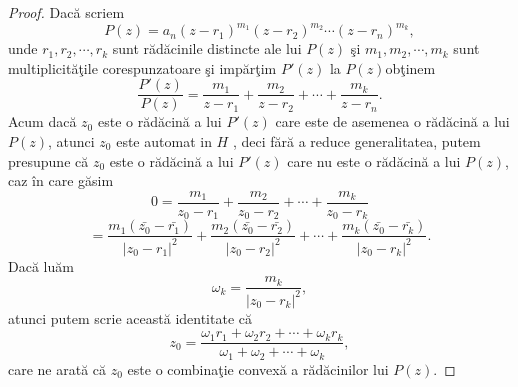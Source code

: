 \documentclass[a4paper,12pt,oneside]{report}
\begin{document}
\begin{proof}
Dac\u{a} scriem
\begin{displaymath}
  P\left ( z \right ) = a_{n}\left ( z - r_{1} \right )^{m_{1}}\left ( z - r_{2} \right )^{m_{2}}\cdots \left ( z - r_{n} \right )^{m_{k}},
\end{displaymath}
unde  \(r_{1} , r_{2}, \cdots, r_{k}\) sunt r\u{a}d\u{a}cinile distincte ale lui \(P\left ( z \right )\) \c{s}i \(m_{1} , m_{2}, \cdots, m_{k}\) sunt multiplicit\u{a}\c{t}ile corespunzatoare \c{s}i imp\u{a}r\c{t}im \({P}'\left ( z \right )\) la \( P\left ( z \right )\)ob\c{t}inem
\begin{displaymath}
  \frac{{P}'\left ( z \right ) }{P\left ( z \right )} = \frac{m_{1}}{z - r_{1}} + \frac{m_{2}}{z - r_{2}}+ \cdots + \frac{m_{k}}{z - r_{n}} .
\end{displaymath}
Acum dac\u{a} \(z_{0}\) este o r\u{a}d\u{a}cin\u{a} a lui \({P}'\left ( z \right )\) care este de asemenea o r\u{a}d\u{a}cin\u{a} a lui \(P\left ( z \right )\), atunci \(z_{0}\) este automat in \(H\) , deci f\u{a}r\u{a} a reduce generalitatea, putem presupune c\u{a} \(z_{0}\)  este o r\u{a}d\u{a}cin\u{a} a lui  \({P}'\left ( z \right )\) care nu este o r\u{a}d\u{a}cin\u{a} a lui \(P\left ( z \right )\), caz \^{i}n care g\u{a}sim
\begin{displaymath}
  0 = \frac{m_{1}}{z_{0} - r_{1}} + \frac{m_{2}}{z_{0} - r_{2}} +\cdots+ \frac{m_{k}}{z_{0} - r_{k}}
\end{displaymath}
\begin{displaymath}
= \frac{m_{1}\left (\bar{z_{0}} - \bar{r_{1}}\right )}{\left | z_{0}  - r_{1}\right |^{2}} + \frac{m_{2}\left (\bar{z_{0}} - \bar{r_{2}}\right )}{\left | z_{0}  - r_{2}\right |^{2}} + \cdots+ \frac{m_{k}\left (\bar{z_{0}} - \bar{r_{k}}\right )}{\left | z_{0}  - r_{k}\right |^{2}}.
\end{displaymath}
Dac\u{a} lu\u{a}m
\begin{displaymath}
  \omega _{k} =\frac{ m_{k}}{\left | z_{0}  - r_{k}\right |^{2}},
\end{displaymath} atunci putem scrie aceast\u{a} identitate c\u{a}
\begin{displaymath}
  z_{0} = \frac{\omega _{1}r_{1} +\omega _{2}r{_2}+\cdots+ \omega _{k}r{_k} }{\omega _{1} + \omega _{2} + \cdots + \omega _{k}},
\end{displaymath}
care ne arat\u{a} c\u{a} \(z_{0}\) este o combina\c{t}ie convex\u{a} a r\u{a}d\u{a}cinilor lui \(P\left ( z \right )\).
\end{proof}
\end{document}
